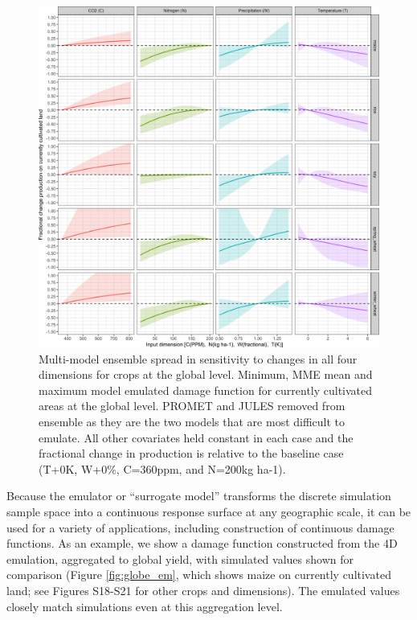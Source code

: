 \documentclass[gmd, manuscript]{copernicus} %
\begin{document}
\begin{figure}[ht]
  \centering
    \includegraphics[width=15cm]{figures/em_CTWN_all_crops.png}
  \caption{Multi-model ensemble spread in sensitivity to changes in all four dimensions for crops at the global level. Minimum, MME mean and maximum model emulated damage function for currently cultivated areas at the global level. 
  PROMET and JULES removed from ensemble as they are the two models that are most difficult to emulate. 
  All other covariates held constant in each case and the fractional change in production is relative to the baseline case (T+0K, W+0\%, C=360ppm, and N=200kg ha-1).}
  \label{fig:all_dims}
\end{figure}

Because the emulator or ``surrogate model'' transforms the discrete simulation sample space into a continuous response surface at any geographic scale, it can be used for a variety of applications, including construction of continuous damage functions. 
As an example, we show a damage function constructed from the 4D emulation, aggregated to global yield, with simulated values shown for comparison (Figure \ref{fig:globe_em}, which shows maize on currently cultivated land; see Figures S18-S21 for other crops and dimensions). 
The emulated values closely match simulations even at this aggregation level.
\end{document}

